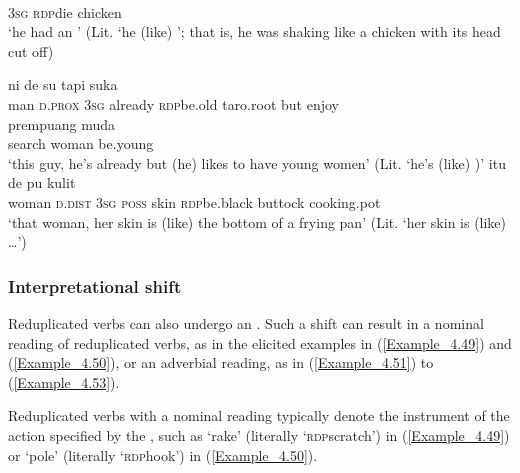 \ea
\label{Example_4.46}
 {} {}\\ %
 \textsc{3sg}  \textsc{rdp}{\Tilde}die  chicken\\
\glt 
‘he had an ’ (Lit. ‘he  (like) ’; that is, he was shaking like a chicken with its head cut off) \textstyleExampleSource{[Elicited BR120813.006]}
\z

\ea
\label{Example_4.47}
 {{ni}} {{de}} {su} {} {} {tapi} {suka}\\ %
 man  {\textsc{d.prox}}  {\textsc{3sg}}  already  \textsc{rdp}{\Tilde}be.old  taro.root  but  enjoy\\
  {prempuang}  {muda}\\
 {search}  {woman}  {be.young}\\
\glt 
‘this guy, he’s already  but (he) likes to have young women’ (Lit. ‘he’s  (like) )’ \textstyleExampleSource{[Elicited BR120813.038]}
\z
\ea
\label{Example_4.48}
 {itu} {de} {pu} {kulit} {} {} {}\\ %
 woman  \textsc{d.dist}  \textsc{3sg}  \textsc{poss}  skin  \textsc{rdp}{\Tilde}be.black  buttock  cooking.pot\\
\glt
‘that woman, her skin is  (like) the bottom of a frying pan’ (Lit. ‘her skin is  (like)  \ldots’) \textstyleExampleSource{[Elicited BR120813.046]}
\z


\subsubsection[Interpretational shift]{Interpretational shift}
\label{Para_4.2.2.8}
Reduplicated verbs can also undergo an . Such a shift can result in a nominal reading of reduplicated verbs, as in the elicited examples in (\ref{Example_4.49}) and (\ref{Example_4.50}), or an adverbial reading, as in (\ref{Example_4.51}) to (\ref{Example_4.53}).



Reduplicated verbs with a nominal reading typically denote the instrument of the action specified by the , such as  ‘rake’ (literally ‘\textsc{rdp}{\Tilde}scratch’) in (\ref{Example_4.49}) or  ‘pole’ (literally ‘\textsc{rdp}{\Tilde}hook’) in (\ref{Example_4.50}).


